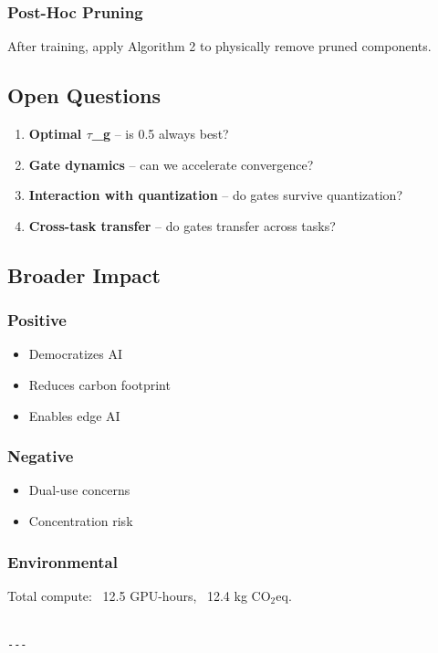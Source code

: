 \subsubsection{Post-Hoc Pruning}
After training, apply Algorithm 2 to physically remove pruned components.

\subsection{Open Questions}

\begin{enumerate}
\item \textbf{Optimal $\tau$\_g} -- is 0.5 always best?
\item \textbf{Gate dynamics} -- can we accelerate convergence?
\item \textbf{Interaction with quantization} -- do gates survive quantization?
\item \textbf{Cross-task transfer} -- do gates transfer across tasks?

\end{enumerate}
\subsection{Broader Impact}

\subsubsection{Positive}
\begin{itemize}
\item Democratizes AI
\item Reduces carbon footprint
\item Enables edge AI

\end{itemize}
\subsubsection{Negative}
\begin{itemize}
\item Dual-use concerns
\item Concentration risk

\end{itemize}
\subsubsection{Environmental}
Total compute: ~12.5 GPU-hours, ~12.4 kg CO$_2$eq.
\begin{lstlisting}

---
\end{lstlisting}

